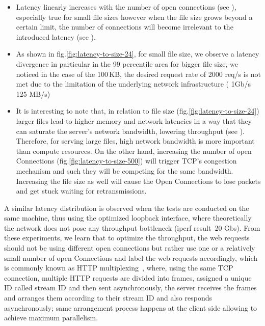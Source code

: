 \documentclass[runningheads]{llncs}
\begin{document}
\begin{itemize}
  \item Latency linearly increases with the number of open connections (see ), especially true for small file sizes however when the file size grows beyond a certain limit, the number of connections will become irrelevant to the introduced latency (see ). 
  \item As shown in fig.\ref{fig:latency-to-size-24}, for small file size, we observe a latency divergence in particular in the 99 percentile area
for bigger file size, we noticed in the case of the 100\,KB, the desired request rate of 2000 req/s is not met due to the limitation of the underlying network infrastructure ( 1Gb/s ~ 125 MB/s)
  \item It is interesting to note that, in relation to file size (fig.\ref{fig:latency-to-size-24}) larger files lead to higher memory and network latencies in a way that they can saturate the server’s network bandwidth, lowering throughput (see ). Therefore,  for  serving  large files,  high  network  bandwidth  is  more  important  than compute resources. On the other hand, increasing the number of open Connections (fig.\ref{fig:latency-to-size-500}) will trigger TCP's congestion mechanism and such they will be competing for the same bandwidth. Increasing the file size as well will cause the Open Connections to lose packets and get stuck waiting for retransmissions.
\end{itemize}
A similar latency distribution is observed when the tests are conducted on the same machine, thus using the optimized\cite{linuxkernelcommit} loopback interface, where theoretically the network does not pose any throughput bottleneck (iperf \cite{iperf} result~20 Gbs).
From these experiments, we learn that to optimize the throughput, the web requests should not be using different open connections but rather use one or a relatively small number of open Connections and label the web requests accordingly, which is commonly known as HTTP multiplexing \,\cite{SMUX}, where, using the same TCP connection, multiple HTTP requests are divided into frames, assigned a unique ID called stream ID and then sent asynchronously, the server receives the frames and arranges them according to their stream ID and also responds asynchronously; same arrangement process happens at the client side allowing to achieve maximum parallelism.
\end{document}
